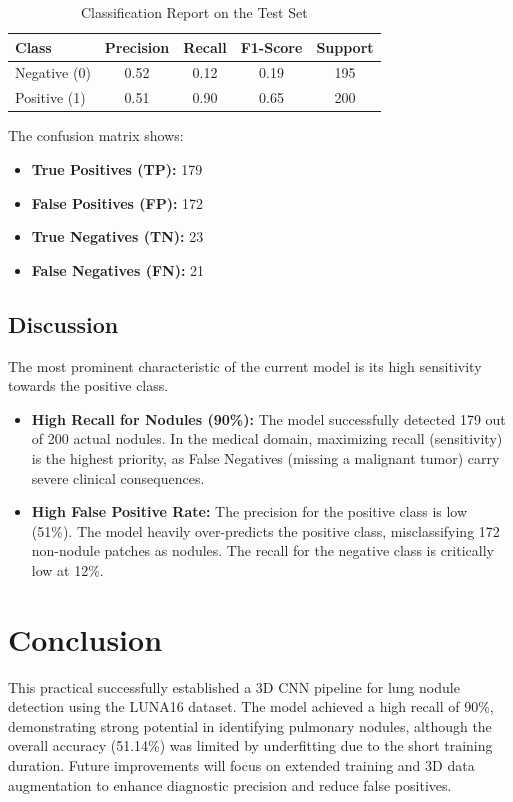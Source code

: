 \documentclass[a4paper, 10pt, twocolumn]{article}
\begin{document}
\begin{table}[h!]
\centering
\caption{Classification Report on the Test Set}
\begin{tabular}{|l|c|c|c|c|}
\hline
\textbf{Class} & \textbf{Precision} & \textbf{Recall} & \textbf{F1-Score} & \textbf{Support} \\ \hline
Negative (0) & 0.52 & 0.12 & 0.19 & 195 \\ \hline
Positive (1) & 0.51 & 0.90 & 0.65 & 200 \\ \hline
\end{tabular}
\end{table}

The confusion matrix shows:
\begin{itemize}
    \item \textbf{True Positives (TP):} 179
    \item \textbf{False Positives (FP):} 172
    \item \textbf{True Negatives (TN):} 23
    \item \textbf{False Negatives (FN):} 21
\end{itemize}

\subsection{Discussion}
The most prominent characteristic of the current model is its high sensitivity towards the positive class. \begin{itemize}
    \item \textbf{High Recall for Nodules (90\%):} The model successfully detected 179 out of 200 actual nodules. In the medical domain, maximizing recall (sensitivity) is the highest priority, as False Negatives (missing a malignant tumor) carry severe clinical consequences. 
    \item \textbf{High False Positive Rate:} The precision for the positive class is low (51\%). The model heavily over-predicts the positive class, misclassifying 172 non-nodule patches as nodules. The recall for the negative class is critically low at 12\%.
\end{itemize}
\section{Conclusion}

This practical successfully established a 3D CNN pipeline for lung nodule detection using the LUNA16 dataset. The model achieved a high recall of 90\%, demonstrating strong potential in identifying pulmonary nodules, although the overall accuracy (51.14\%) was limited by underfitting due to the short training duration. Future improvements will focus on extended training and 3D data augmentation to enhance diagnostic precision and reduce false positives.
\end{document}
